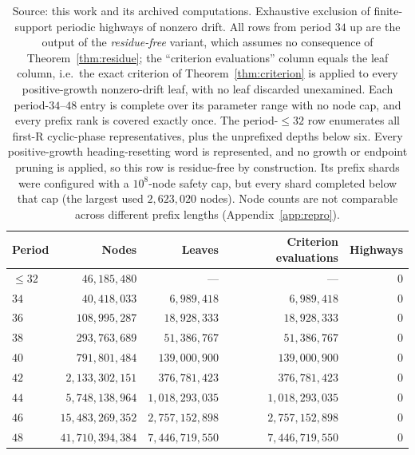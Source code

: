 \documentclass[11pt,letterpaper]{article}
\theoremstyle{plain}
\theoremstyle{definition}
\newcommand{\turnR}{\mathrm{R}}
\begin{document}
\begin{NoHyper}
\begin{table}[ht]
\centering
\begin{tabular}{@{}lrrrr@{}}
\toprule
Period & Nodes & Leaves & Criterion evaluations & Highways \\
\midrule
$\le 32$ & $46{,}185{,}480$ & --- & --- & $0$\\
$34$ & $40{,}418{,}033$      & $6{,}989{,}418$      & $6{,}989{,}418$      & $0$\\
$36$ & $108{,}995{,}287$     & $18{,}928{,}333$     & $18{,}928{,}333$     & $0$\\
$38$ & $293{,}763{,}689$     & $51{,}386{,}767$     & $51{,}386{,}767$     & $0$\\
$40$ & $791{,}801{,}484$     & $139{,}000{,}900$    & $139{,}000{,}900$    & $0$\\
$42$ & $2{,}133{,}302{,}151$ & $376{,}781{,}423$    & $376{,}781{,}423$    & $0$\\
$44$ & $5{,}748{,}138{,}964$ & $1{,}018{,}293{,}035$& $1{,}018{,}293{,}035$& $0$\\
$46$ & $15{,}483{,}269{,}352$& $2{,}757{,}152{,}898$& $2{,}757{,}152{,}898$& $0$\\
$48$ & $41{,}710{,}394{,}384$& $7{,}446{,}719{,}550$& $7{,}446{,}719{,}550$& $0$\\
\bottomrule
\end{tabular}
\caption{Source: this work and its archived computations. Exhaustive exclusion of finite-support periodic highways of nonzero drift.
All rows from period $34$ up are the output of the \emph{residue-free} variant, which
assumes no consequence of Theorem~\ref{thm:residue}; the ``criterion evaluations''
column equals the leaf column, i.e.\ the exact criterion of
Theorem~\ref{thm:criterion} is applied to every positive-growth nonzero-drift leaf,
with no leaf discarded unexamined. Each period-$34$--$48$ entry is complete over its
parameter range with no node cap, and every prefix rank is covered exactly once. The
period-$\le32$ row enumerates all first-$\turnR$ cyclic-phase representatives, plus
the unprefixed depths below six. Every positive-growth heading-resetting word is
represented, and no growth or endpoint pruning is applied, so this row is
residue-free by construction. Its prefix shards were configured with a
$10^8$-node safety cap, but every shard completed below that cap (the largest used
$2{,}623{,}020$ nodes). Node counts are not comparable across different prefix
lengths (Appendix~\ref{app:repro}).}
\label{tab:excl}
\end{table}


\end{NoHyper}
\end{document}
